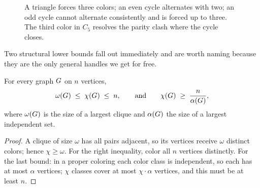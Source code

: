 \begin{figure}[H]
\centering
{}
\caption{A triangle forces three colors; an even cycle alternates with two; an odd
cycle cannot alternate consistently and is forced up to three. The third color in
$C_5$ resolves the parity clash where the cycle closes.}
\label{ch28:fig-small}
\end{figure}

Two structural lower bounds fall out immediately and are worth naming because they
are the only general handles we get for free.

\begin{proposition}
\label{ch28:prop-bounds}
For every graph $G$ on $n$ vertices,
\[
  \omega(G) \;\le\; \chi(G) \;\le\; n,
  \qquad\text{and}\qquad
  \chi(G)\;\ge\;\frac{n}{\alpha(G)},
\]
where $\omega(G)$ is the size of a largest clique and $\alpha(G)$ the size
of a largest independent set.
\end{proposition}

\begin{proof}
A clique of size $\omega$ has all pairs adjacent, so its vertices receive
$\omega$ distinct colors; hence $\chi\ge\omega$. For the right inequality, color
all $n$ vertices distinctly. For the last bound: in a proper coloring each color
class is independent, so each has at most $\alpha$ vertices; $\chi$ classes cover
at most $\chi\cdot\alpha$ vertices, and this must be at least $n$.
\end{proof}

